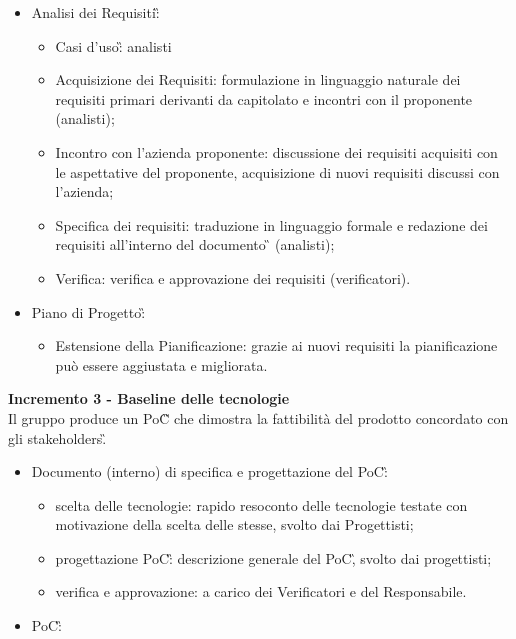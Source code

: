 {{    \begin{itemize}
        \item Analisi dei Requisiti\G:
            \begin{itemize}
                \item Casi d'uso\G: analisti
                \item Acquisizione dei Requisiti: formulazione in linguaggio naturale dei requisiti primari derivanti da capitolato e incontri con il proponente (analisti);
                \item Incontro con l'azienda proponente: discussione dei requisiti acquisiti con le aspettative del proponente, acquisizione di nuovi requisiti discussi con l'azienda;
                \item Specifica dei requisiti: traduzione in linguaggio formale e redazione dei requisiti all'interno del documento \AdR\G{} (analisti);
                \item Verifica: verifica e approvazione dei requisiti (verificatori).
            \end{itemize}
    \item Piano di Progetto\G: 
        \begin{itemize}
            \item Estensione della Pianificazione: grazie ai nuovi requisiti la pianificazione può essere aggiustata e migliorata.
        \end{itemize} 
    \end{itemize}
    \textbf{Incremento 3 - Baseline delle tecnologie} \\
    Il gruppo produce un PoC\G{} che dimostra la fattibilità del prodotto concordato con gli stakeholders\G. \\
    \begin{itemize}
        \item Documento (interno) di specifica e progettazione del PoC\G:
            \begin{itemize}
                \item scelta delle tecnologie: rapido resoconto delle tecnologie testate con motivazione della scelta delle stesse, svolto dai Progettisti;
                \item progettazione PoC\G: descrizione generale del PoC\G, svolto dai progettisti;
                \item verifica e approvazione: a carico dei Verificatori e del Responsabile.
            \end{itemize}
        \item PoC\G: 

\end{itemize}}}

